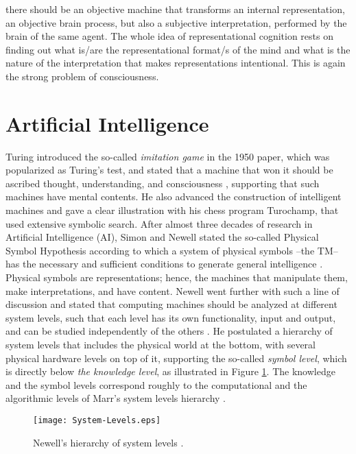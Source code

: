 \documentclass[11pt]{article}
\begin{document}
there should be an objective machine that transforms an internal representation, an objective brain process, but also a subjective interpretation, performed by the brain of the same agent. The whole idea of representational cognition rests on finding out what is/are the representational format/s of the mind and what is the nature of the interpretation that makes representations intentional. This is again the strong problem of consciousness.

\section{Artificial Intelligence}
\label{sec:AI}

Turing introduced the so-called \emph{imitation game} in the 1950 paper, which was popularized as Turing's test, and stated that a machine that won it should be ascribed thought, understanding, and consciousness \cite{turing-1950}, supporting that such machines have mental contents. He also advanced the construction of intelligent machines and gave a clear illustration with his chess program Turochamp, that used extensive symbolic search. After almost three decades of research in Artificial Intelligence (AI), Simon and Newell stated the so-called Physical Symbol Hypothesis according to which a system of physical symbols --the TM-- has the necessary and sufficient conditions to generate general intelligence \cite{Newell-Simon}. Physical symbols are representations; hence, the machines that manipulate them, make interpretations, and have content. Newell went further with such a line of discussion and stated that computing machines should be analyzed at different system levels, such that each level has its own functionality, input and output, and can be studied independently of the others \cite{Newell}. He postulated a hierarchy of system levels that includes the physical world at the bottom, with several physical hardware levels on top of it, supporting the so-called \emph{symbol level}, which is directly below \emph{the knowledge level}, as illustrated in Figure \ref{fig:knowledge-level}. The knowledge and the symbol levels correspond roughly to the computational and the algorithmic levels of Marr's system levels hierarchy \cite{Marr}.

\begin{figure}[ht]
\texttt{[image: System-Levels.eps]}
\centering
\caption{Newell's hierarchy of system levels \cite{Pineda-2024}.}
\label{fig:knowledge-level}
\end{figure}
\end{document}
